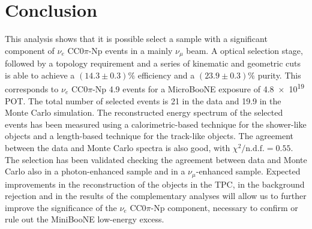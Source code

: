 
\section{Conclusion}
This analysis shows that it is possible select a sample with a significant component of $\nu_{e}$ CC0$\pi$-Np events in a mainly $\nu_\mu$ beam. A optical selection stage, followed by a topology requirement and a series of kinematic and geometric cuts is able to achieve a $(14.3\pm0.3)\%$ efficiency and a $(23.9\pm0.3)\%$ purity. This corresponds to $\nu_{e}$ CC0$\pi$-Np 4.9 events for a MicroBooNE exposure of \num{4.8e19} POT. The total number of selected events is 21 in the data and 19.9 in the Monte Carlo simulation. 
The reconstructed energy spectrum of the selected events has been measured using a calorimetric-based technique for the shower-like objects and a length-based technique for the track-like objects. The agreement between the data and Monte Carlo spectra is also good, with $\chi^{2} / \mathrm{n.d.f.} = 0.55$.
The selection has been validated checking the agreement between data and Monte Carlo also in a photon-enhanced sample and in a $\nu_\mu$-enhanced sample.
Expected improvements in the reconstruction of the objects in the TPC, in the background rejection and in the results of the complementary analyses will allow us to further improve the significance of the $\nu_{e}$ CC0$\pi$-Np component, necessary to confirm or rule out the MiniBooNE low-energy excess.